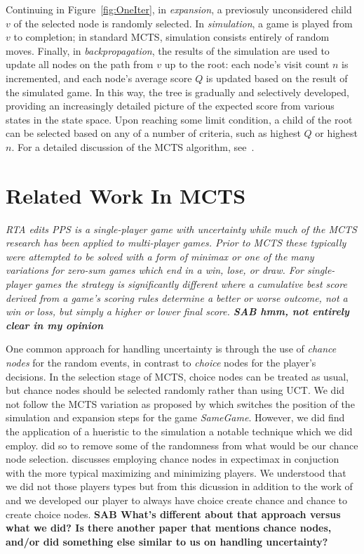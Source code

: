 \documentclass[letterpaper]{article}
\begin{document}
Continuing in Figure~\ref{fig:OneIter}, in {\it expansion}, a previosuly unconsidered child $v$ of the selected node is randomly selected. In {\it simulation}, a game is played from $v$ to completion; in standard MCTS, simulation consists entirely of random moves. Finally, in {\it backpropagation}, the results of the simulation are used to update all nodes on the path from $v$ up to the root: each node's visit count $n$ is incremented, and each node's average score $Q$ is updated based on the result of the simulated game. In this way, the tree is gradually and selectively developed, providing an increasingly detailed picture of the expected score from various states in the state space. Upon reaching some limit condition, a child of the root can be selected based on any of a number of criteria, such as highest $Q$ or highest $n$. For a detailed discussion of the MCTS algorithm, see~\cite{browne2012survey}.

\section{Related Work In MCTS}

{\it RTA edits PPS is a single-player game with uncertainty while much of the MCTS research has been applied to multi-player games. Prior to MCTS these typically were attempted to be solved with a form of minimax or one of the many variations for zero-sum games which end in a win, lose, or draw. For single-player games the strategy is significantly different where a cumulative best score derived from a game's scoring rules determine a better or worse outcome, not a win or loss, but simply a higher or lower final score. {\bf SAB hmm, not entirely clear in my opinion} }

One common approach for handling uncertainty is through the use of {\it chance nodes} for the random events, in contrast to {\it choice} nodes for the player's decisions. In the selection stage of MCTS, choice nodes can be treated as usual, but chance nodes should be selected randomly rather than using UCT. We did not follow the MCTS variation as proposed by \cite{schadd2012single} which switches the position of the simulation and expansion steps for the game {\it SameGame}. However, we did find the application of a hueristic to the simulation a notable technique which we did employ. \cite{schadd2012single} did so to remove some of the randomness from what would be our chance node selection. \cite{veness2006expectimax} discusses employing chance nodes in expectimax in conjuction with the more typical maximizing and minimizing players. We understood that we did not those players types but from this dicussion in addition to the work of \cite{melko2007optimal}  and \cite{hauk2004search} we developed our player to always have choice create chance and chance to create choice nodes. {\bf SAB What's different about that approach versus what we did? Is there another paper that mentions chance nodes, and/or did something else similar to us on handling uncertainty?}
\end{document}
